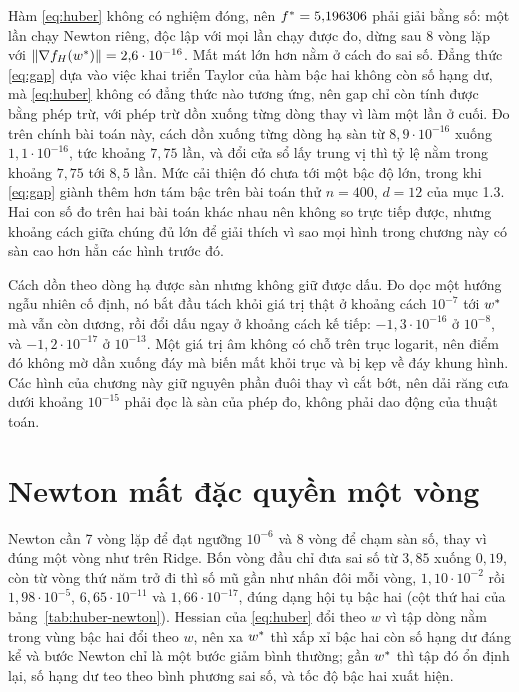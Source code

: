 \documentclass[12pt, a4paper, oneside]{report}
\theoremstyle{definition}
\begin{document}
Hàm \eqref{eq:huber} không có nghiệm đóng, nên $f^{*} = 5{,}196306$ phải giải
bằng số: một lần chạy Newton riêng, độc lập với mọi lần chạy được đo, dừng sau 8
vòng lặp với $\lVert\nabla f_{H}(w^{*})\rVert = 2{,}6 \cdot 10^{-16}$. Mất mát lớn hơn
nằm ở cách đo sai số. Đẳng thức \eqref{eq:gap} dựa vào việc khai triển Taylor của
hàm bậc hai không còn số hạng dư, mà \eqref{eq:huber} không có đẳng thức nào
tương ứng, nên gap chỉ còn tính được bằng phép trừ, với phép trừ dồn xuống từng
dòng thay vì làm một lần ở cuối. Đo trên chính bài toán này, cách dồn xuống từng
dòng hạ sàn từ $8{,}9 \cdot 10^{-16}$ xuống $1{,}1 \cdot 10^{-16}$, tức khoảng
$7{,}75$ lần, và đổi cửa sổ lấy trung vị thì tỷ lệ nằm trong khoảng $7{,}75$ tới
$8{,}5$ lần. Mức cải thiện đó chưa tới một bậc độ lớn, trong khi \eqref{eq:gap}
giành thêm hơn tám bậc trên bài toán thử $n = 400$, $d = 12$ của mục 1.3. Hai con
số đo trên hai bài toán khác nhau nên không so trực tiếp được, nhưng khoảng cách
giữa chúng đủ lớn để giải thích vì sao mọi hình trong chương này có sàn cao hơn
hẳn các hình trước đó.

Cách dồn theo dòng hạ được sàn nhưng không giữ được dấu. Đo dọc một hướng ngẫu
nhiên cố định, nó bắt đầu tách khỏi giá trị thật ở khoảng cách $10^{-7}$ tới
$w^{*}$ mà vẫn còn dương, rồi đổi dấu ngay ở khoảng cách kế tiếp: $-1{,}3 \cdot
10^{-16}$ ở $10^{-8}$, và $-1{,}2 \cdot 10^{-17}$ ở $10^{-13}$. Một giá trị âm
không có chỗ trên trục
logarit, nên điểm đó không mờ dần xuống đáy mà biến mất khỏi trục và bị kẹp về đáy
khung hình. Các hình của chương này giữ nguyên phần đuôi thay vì cắt bớt, nên dải
răng cưa dưới khoảng $10^{-15}$ phải đọc là sàn của phép đo, không phải dao động
của thuật toán.

\section{Newton mất đặc quyền một vòng}

Newton cần 7 vòng lặp để đạt ngưỡng $10^{-6}$ và 8 vòng để chạm sàn số, thay vì
đúng một vòng như trên Ridge. Bốn vòng đầu chỉ đưa sai số từ $3{,}85$ xuống
$0{,}19$, còn từ vòng thứ năm trở đi thì số mũ gần như nhân đôi mỗi vòng,
$1{,}10 \cdot 10^{-2}$ rồi $1{,}98 \cdot 10^{-5}$, $6{,}65 \cdot 10^{-11}$ và
$1{,}66 \cdot 10^{-17}$, đúng dạng hội tụ bậc hai \cite{nocedal2006numerical}
(cột thứ hai của bảng~\ref{tab:huber-newton}). Hessian của \eqref{eq:huber} đổi
theo $w$ vì tập dòng nằm trong vùng bậc hai đổi theo $w$, nên xa $w^{*}$ thì xấp
xỉ bậc hai còn số hạng dư đáng kể và bước Newton chỉ là một bước giảm bình thường;
gần $w^{*}$ thì tập đó ổn định lại, số hạng dư teo theo bình phương sai số, và
tốc độ bậc hai xuất hiện.
\end{document}

